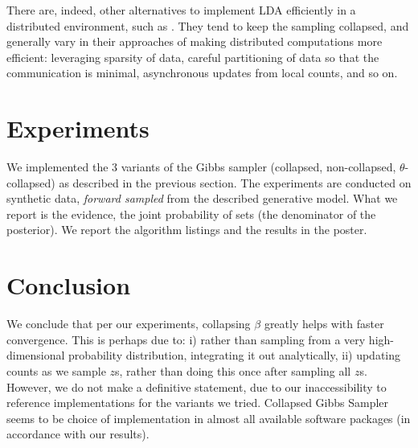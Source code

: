 \documentclass{article}%
\begin{document}
There are, indeed, other alternatives to implement LDA efficiently in a distributed environment, such as \cite{newman2009distributed, smyth2009asynchronous}. They tend to keep the sampling collapsed, and generally vary in their approaches of making distributed computations more efficient: leveraging sparsity of data, careful partitioning of data so that the communication is minimal,  asynchronous updates from local counts, and so on. 


\section{Experiments}
We implemented the 3 variants of the Gibbs sampler (collapsed, non-collapsed, $\theta$-collapsed) as described in the previous section. The experiments are conducted on synthetic data, \textit{forward sampled} from the described generative model. What we report is the evidence, the joint probability of sets (the denominator of the posterior). We report the algorithm listings and the results in the poster. 

\section{Conclusion}
We conclude that per our experiments, collapsing $\beta$  greatly helps with faster convergence. This is perhaps due to: i) rather than sampling from a very high-dimensional probability distribution, integrating it out analytically, ii) updating counts as we sample $z$s, rather than doing this once after sampling all $z$s. However, we do not make a definitive statement, due to our inaccessibility to reference implementations for the variants we tried. Collapsed Gibbs Sampler seems to be choice of implementation in almost all available software packages (in accordance with our results).



\end{document}
